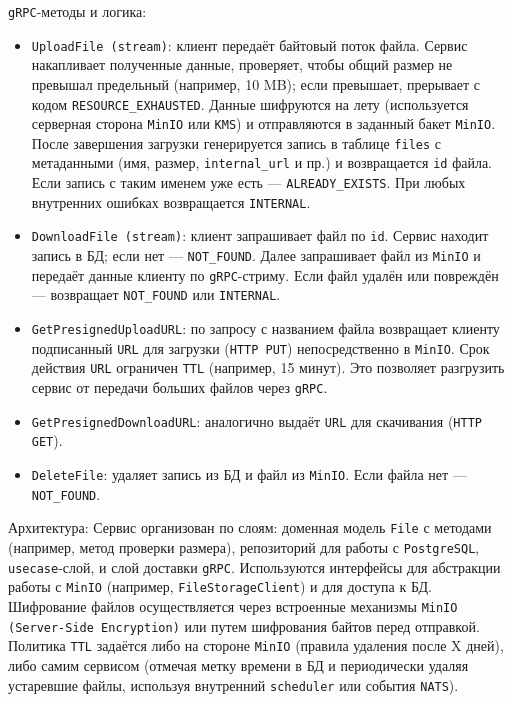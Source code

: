 \texttt{gRPC}-методы и логика:
\begin{itemize}
    \item \texttt{UploadFile (stream)}: клиент передаёт байтовый поток файла. Сервис накапливает полученные данные, проверяет, чтобы общий размер не превышал предельный (например, 10 MB); если превышает, прерывает с кодом \texttt{RESOURCE\_EXHAUSTED}. Данные шифруются на лету (используется серверная сторона \texttt{MinIO} или \texttt{KMS}) и отправляются в заданный бакет \texttt{MinIO}. После завершения загрузки генерируется запись в таблице \texttt{files} с метаданными (имя, размер, \texttt{internal\_url} и пр.) и возвращается \texttt{id} файла. Если запись с таким именем уже есть — \texttt{ALREADY\_EXISTS}. При любых внутренних ошибках возвращается \texttt{INTERNAL}.
    \item \texttt{DownloadFile (stream)}: клиент запрашивает файл по \texttt{id}. Сервис находит запись в БД; если нет — \texttt{NOT\_FOUND}. Далее запрашивает файл из \texttt{MinIO} и передаёт данные клиенту по \texttt{gRPC}-стриму. Если файл удалён или повреждён — возвращает \texttt{NOT\_FOUND} или \texttt{INTERNAL}.
    \item \texttt{GetPresignedUploadURL}: по запросу с названием файла возвращает клиенту подписанный \texttt{URL} для загрузки (\texttt{HTTP PUT}) непосредственно в \texttt{MinIO}. Срок действия \texttt{URL} ограничен \texttt{TTL} (например, 15 минут). Это позволяет разгрузить сервис от передачи больших файлов через \texttt{gRPC}.
    \item \texttt{GetPresignedDownloadURL}: аналогично выдаёт \texttt{URL} для скачивания (\texttt{HTTP GET}).
    \item \texttt{DeleteFile}: удаляет запись из БД и файл из \texttt{MinIO}. Если файла нет — \texttt{NOT\_FOUND}.
\end{itemize}
\noindent Архитектура: Сервис организован по слоям: доменная модель \texttt{File} с методами (например, метод проверки размера), репозиторий для работы с \texttt{PostgreSQL}, \texttt{usecase}-слой, и слой доставки \texttt{gRPC}. Используются интерфейсы для абстракции работы с \texttt{MinIO} (например, \texttt{FileStorageClient}) и для доступа к БД. Шифрование файлов осуществляется через встроенные механизмы \texttt{MinIO (Server-Side Encryption)} или путем шифрования байтов перед отправкой. Политика \texttt{TTL} задаётся либо на стороне \texttt{MinIO} (правила удаления после X дней), либо самим сервисом (отмечая метку времени в БД и периодически удаляя устаревшие файлы, используя внутренний \texttt{scheduler} или события \texttt{NATS}).

